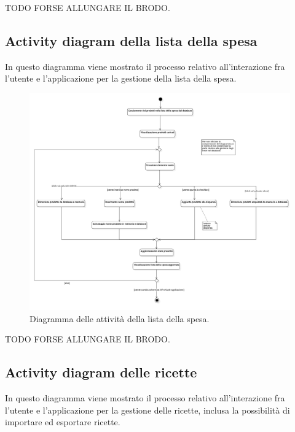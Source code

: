 TODO FORSE ALLUNGARE IL BRODO.

\newpage

\subsection{Activity diagram della lista della spesa}

In questo diagramma viene mostrato il processo relativo all'interazione fra l'utente e l'applicazione per la gestione della lista della spesa.

\begin{figure}[H]
    \includegraphics[width=\linewidth]{images/activity-shopping-list.png}
    \caption{Diagramma delle attività della lista della spesa.}
    \label{fig:actshoplist}
\end{figure}

TODO FORSE ALLUNGARE IL BRODO.

\newpage

\subsection{Activity diagram delle ricette}

In questo diagramma viene mostrato il processo relativo all'interazione fra l'utente e l'applicazione per la gestione delle ricette, inclusa la possibilità di importare ed esportare ricette.

